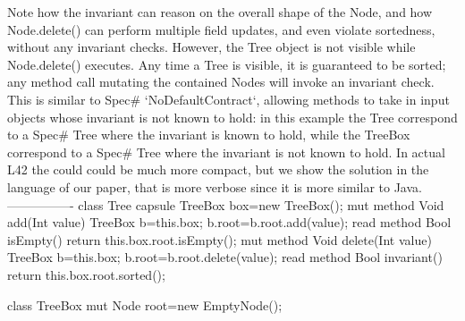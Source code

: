Note how the invariant can reason on the overall shape of the Node, and
how Node.delete() can perform multiple field updates,
and even violate sortedness, without any invariant checks.
However, the Tree object is not visible while Node.delete() executes.
Any time a Tree is visible, it is guaranteed to be sorted;
any method call mutating the contained Nodes will invoke an invariant check.
This is similar to Spec# `NoDefaultContract`, allowing methods to take in input
objects whose invariant is not known to hold:
in this example the Tree correspond to a Spec# Tree where the invariant
is known to hold, while the TreeBox correspond to a Spec# Tree where the invariant is not known to hold.
In actual L42 the could could be much more compact, but we show the solution in the language of our paper,
that is more verbose since it is more similar to Java.
----------------   
class Tree {
  capsule TreeBox box=new TreeBox();
  mut method Void add(Int value) {TreeBox b=this.box; b.root=b.root.add(value);}
  read method Bool isEmpty() {return this.box.root.isEmpty();}
  mut method Void delete(Int value) {TreeBox b=this.box; b.root=b.root.delete(value);}
  read method Bool invariant() {return this.box.root.sorted();}
}

class TreeBox{ mut Node root=new EmptyNode();}

